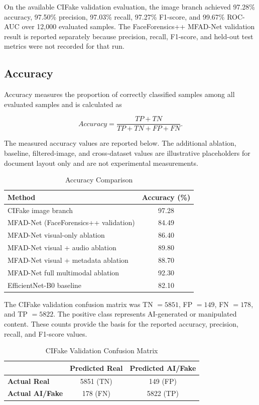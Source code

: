 \documentclass[conference]{IEEEtran}
\begin{document}
On the available CIFake validation evaluation, the image branch achieved 97.28\% accuracy, 97.50\% precision, 97.03\% recall, 97.27\% F1-score, and 99.67\% ROC-AUC over 12,000 evaluated samples. The FaceForensics++ MFAD-Net validation result is reported separately because precision, recall, F1-score, and held-out test metrics were not recorded for that run.

\subsection{Accuracy}

Accuracy measures the proportion of correctly classified samples among all evaluated samples and is calculated as

\begin{equation}
Accuracy =
\frac{TP+TN}{TP+TN+FP+FN}.
\end{equation}

The measured accuracy values are reported below. The additional ablation, baseline, filtered-image, and cross-dataset values are illustrative placeholders for document layout only and are not experimental measurements.

\begin{table}[htbp]
\caption{Accuracy Comparison}
\label{tab:accuracy}
\centering
\begin{tabular}{lc}
\hline
\textbf{Method} & \textbf{Accuracy (\%)}\\
\hline
CIFake image branch & 97.28\\
MFAD-Net (FaceForensics++ validation) & 84.49\\
MFAD-Net visual-only ablation & 86.40\\
MFAD-Net visual + audio ablation & 89.80\\
MFAD-Net visual + metadata ablation & 88.70\\
MFAD-Net full multimodal ablation & 92.30\\
EfficientNet-B0 baseline & 82.10\\
\hline
\end{tabular}
\end{table}

The CIFake validation confusion matrix was TN $=5851$, FP $=149$, FN $=178$, and TP $=5822$. The positive class represents AI-generated or manipulated content. These counts provide the basis for the reported accuracy, precision, recall, and F1-score values.

\begin{table}[htbp]
\caption{CIFake Validation Confusion Matrix}
\label{tab:confusion_matrix}
\centering
\begin{tabular}{lcc}
\hline
 & \textbf{Predicted Real} & \textbf{Predicted AI/Fake}\\
\hline
\textbf{Actual Real} & 5851 (TN) & 149 (FP)\\
\textbf{Actual AI/Fake} & 178 (FN) & 5822 (TP)\\
\hline
\end{tabular}
\end{table}
\end{document}
